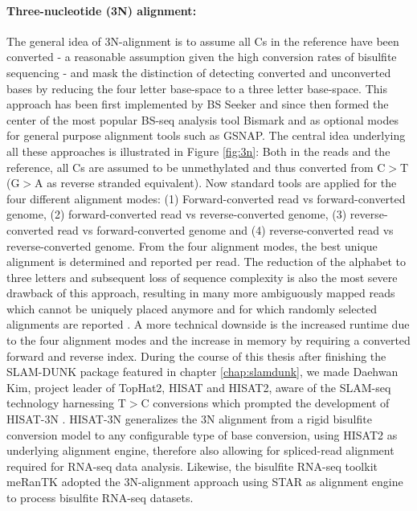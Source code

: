 \paragraph{Three-nucleotide (3N) alignment:} The general idea of 3N-alignment is to assume all Cs in the reference have been converted - a reasonable assumption given the high conversion rates of bisulfite sequencing - and mask the distinction of detecting converted and unconverted bases by reducing the four letter base-space to a three letter base-space. This approach has been first implemented by BS Seeker \citep{Chen2010} and since then formed the center of the most popular BS-seq analysis tool Bismark \citep{Krueger2011} and as optional modes for general purpose alignment tools such as GSNAP. The central idea underlying all these approaches is illustrated in Figure \ref{fig:3n}: Both in the reads and the reference, all Cs are assumed to be unmethylated and thus converted from C$>$T (G$>$A as reverse stranded equivalent). Now standard tools are applied for the four different alignment modes: (1) Forward-converted read vs forward-converted genome, (2) forward-converted read vs reverse-converted genome, (3) reverse-converted read vs forward-converted genome and (4) reverse-converted read vs reverse-converted genome. From the four alignment modes, the best unique alignment is determined and reported per read. The reduction of the alphabet to three letters and subsequent loss of sequence complexity is also the most severe drawback of this approach, resulting in many more ambiguously mapped reads which cannot be uniquely placed anymore and for which randomly selected alignments are reported \citep{Zhang2021}. A more technical downside is the increased runtime due to the four alignment modes and the increase in memory by requiring a converted forward and reverse index. During the course of this thesis after finishing the SLAM-DUNK package featured in chapter \ref{chap:slamdunk}, we made Daehwan Kim, project leader of TopHat2, HISAT and HISAT2, aware of the SLAM-seq technology harnessing T$>$C conversions which prompted the development of HISAT-3N \citep{Zhang2021}. HISAT-3N generalizes the 3N alignment from a rigid bisulfite conversion model to any configurable type of base conversion, using HISAT2 as underlying alignment engine, therefore also allowing for spliced-read alignment required for RNA-seq data analysis. Likewise, the bisulfite RNA-seq toolkit meRanTK \citep{Rieder2016} adopted the 3N-alignment approach using STAR as alignment engine to process bisulfite RNA-seq datasets.

